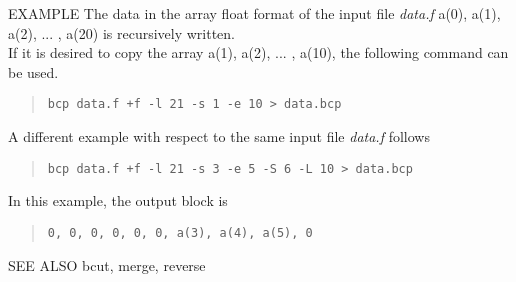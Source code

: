\begin{qsection}{EXAMPLE}
The data in the array float format of the input file {\em data.f}
{a(0), a(1), a(2), ... , a(20)} is recursively written.\\
If it is desired to copy the array {a(1), a(2), ... , a(10)}, 
the following command can be used.
\begin{quote}
\verb!bcp data.f +f -l 21 -s 1 -e 10 > data.bcp!
\end{quote}

\par
A different example with respect to the same input file {\em data.f}
follows

\begin{quote}
\verb!bcp data.f +f -l 21 -s 3 -e 5 -S 6 -L 10 > data.bcp!
\end{quote}

In this example, the output block is
\begin{quote}
\verb!0, 0, 0, 0, 0, 0, a(3), a(4), a(5), 0!
\end{quote}
\end{qsection}

\begin{qsection}{SEE ALSO}
bcut, merge, reverse
\end{qsection}
